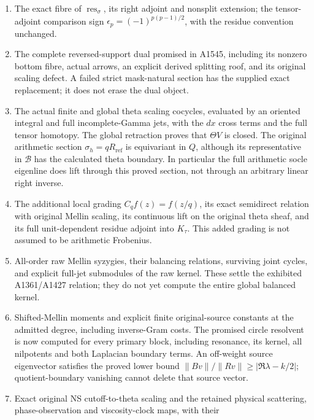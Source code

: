 \begin{enumerate}
\def\labelenumi{\arabic{enumi}.}
\tightlist
\item
  The exact fibre of \(\operatorname{res}_\sigma\), its right adjoint
  and nonsplit extension; the tensor-adjoint comparison sign
  \(\epsilon_p=(-1)^{p(p-1)/2}\), with the residue convention unchanged.
\item
  The complete reversed-support dual promised in A1545, including its
  nonzero bottom fibre, actual arrows, an explicit derived splitting
  roof, and its original scaling defect. A failed strict mask-natural
  section has the supplied exact replacement; it does not erase the dual
  object.
\item
  The actual finite and global theta scaling cocycles, evaluated by an
  oriented integral and full incomplete-Gamma jets, with the \(dx\)
  cross terms and the full tensor homotopy. The global retraction proves
  that \(\Theta V\) is closed. The original arithmetic section
  \(\sigma_h=qR_{\mathrm{ref}}\) is equivariant in \(Q\), although its
  representative in \(\mathscr B\) has the calculated theta boundary. In
  particular the full arithmetic socle eigenline does lift through this
  proved section, not through an arbitrary linear right inverse.
\item
  The additional local grading \(C_qf(z)=f(z/q)\), its exact semidirect
  relation with original Mellin scaling, its continuous lift on the
  original theta sheaf, and its full unit-dependent residue adjoint into
  \(K_\tau\). This added grading is not assumed to be arithmetic
  Frobenius.
\item
  All-order raw Mellin syzygies, their balancing relations, surviving
  joint cycles, and explicit full-jet submodules of the raw kernel.
  These settle the exhibited A1361/A1427 relation; they do not yet
  compute the entire global balanced kernel.
\item
  Shifted-Mellin moments and explicit finite original-source constants
  at the admitted degree, including inverse-Gram costs. The promised
  circle resolvent is now computed for every primary block, including
  resonance, its kernel, all nilpotents and both Laplacian boundary
  terms. An off-weight source eigenvector satisfies the proved lower
  bound \(\|Bv\|/\|Rv\|\ge |\Re\lambda-k/2|\); quotient-boundary
  vanishing cannot delete that source vector.
\item
  Exact original NS cutoff-to-theta scaling and the retained physical
  scattering, phase-observation and viscosity-clock maps, with their

\end{enumerate}
